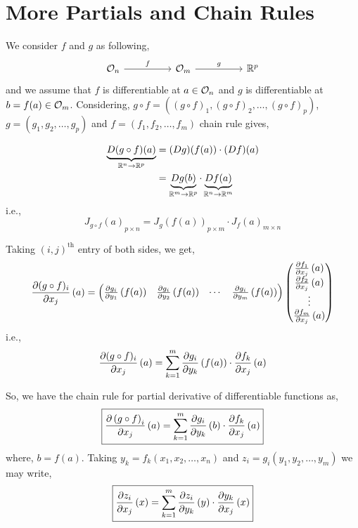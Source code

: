 \documentclass[../Analysis-3.tex]{subfiles}
\begin{document}
\section{More Partials and Chain Rules}

We consider $ f $ and $ g $ as following,
\[\begin{tikzcd}
    {\Op{n}} && {\Op{m}} && {\R^p}
    \arrow["f", from=1-1, to=1-3]
    \arrow["g", from=1-3, to=1-5]
  \end{tikzcd}\]
and we assume that $f$ is differentiable at $a \in \mathcal{O}_{n}$ and $g$ is differentiable at $b = f(a) \in \mathcal{O}_{m}$. Considering, $g \circ f = \left( (g \circ f)_1, (g \circ f)_2, \ldots, (g \circ f)_p \right)$, $g = \left( g_1, g_2, \ldots, g_p \right)$ and $f = \left( f_1, f_2, \ldots, f_m \right)$ chain rule gives,

\begin{align*}
  \underbrace{D(g \circ f)(a)}_{\mathbb{R}^n \to \mathbb{R}^p}
   & = (Dg)(f(a))\cdot (Df)(a)                                                     \\
   & = \underbrace{Dg(b)}_{\mathbb{R}^m \to \mathbb{R}^p} \cdot \underbrace{Df(a)}_{\mathbb{R}^n \to \mathbb{R}^m}
\end{align*}
i.e.,
\[ {J_{g \circ f}(a)}_{p \times n} = {J_{g}(f(a))}_{p \times m}\cdot {J_{f}(a)}_{m \times n} \]

Taking $(i,j)^{\text{th}}$ entry of both sides, we get,
\[  \pdv{(g\circ f)_{i}}{x_j}\left( a \right) = \begin{pmatrix}
    \pdv{g_i}{y_1}\left( f(a) \right) & \pdv{g_i}{y_2}\left( f(a) \right) & \cdots & \pdv{g_i}{y_m}\left( f(a) \right)
  \end{pmatrix} \begin{pmatrix}
    \pdv{f_1}{x_j}\left( a \right) \\
    \pdv{f_2}{x_j}\left( a \right) \\
    \vdots                         \\
    \pdv{f_m}{x_j}\left( a \right)
  \end{pmatrix} \]
i.e.,
\[  \pdv{(g\circ f)_{i}}{x_j}\left( a \right) = \sum_{k = 1}^{m} \pdv{g_i}{y_k}\left( f(a) \right)\cdot\pdv{f_k}{x_j}\left( a \right)  \]

So, we have the chain rule for partial derivative of differentiable functions as,
\[  \boxed{
    \pdv{\left( g\circ f \right)_i}{x_j}\left( a \right) = \sum_{k = 1}^{m} \pdv{g_i}{y_k}\left( b \right)\cdot\pdv{f_k}{x_j}\left( a \right)
  } \]
where, $b = f(a)$. Taking $y_k = f_k \left( x_1, x_2, \ldots, x_n \right)$ and $z_i = g_i \left( y_1, y_2, \ldots, y_m \right)$ we may write,
\[  \boxed{
    \pdv{z_i}{x_j}\left( x \right) = \sum_{k=1}^{m} \pdv{z_i}{y_k}\left( y \right) \cdot \pdv{y_k}{x_j}\left( x \right)
  } \]
\end{document}
